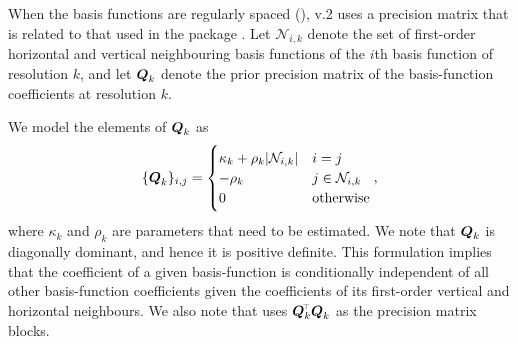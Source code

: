\documentclass[article]{jss}
\def\mbf#1{{%
\mathchoice%
{\hbox{\boldmath$\displaystyle{#1}$}}%
{\hbox{\boldmath$\textstyle{#1}$}}%
{\hbox{\boldmath$\scriptstyle{#1}$}}%
{\hbox{\boldmath$\scriptscriptstyle{#1}$}}%
}}
\def\vec{\mbf}
\newcommand{\tp}{{\!\scriptscriptstyle \top}}
\begin{document}
\begin{appendix}
When the basis functions are regularly spaced (),  v.2 uses a precision matrix that is related to that used in the  package  \citep{Nychka_2016_LatticeKrig}. 
 Let $\mathcal{N}_{i, k}$ denote the set of first-order horizontal and vertical neighbouring basis functions of the $i$th basis function of resolution $k$, 
 and let $\vec{Q}_k$ denote the prior precision matrix of the basis-function coefficients at resolution $k$. 

We model the elements of $\vec{Q}_k$ as
\begin{equation}\label{eqn:Q_k}
    \{\vec{Q}_{k}\}_{i, j}
=
\begin{cases}
\kappa_k + \rho_k |\mathcal{N}_{i, k}|   & i = j\\
-\rho_k & j \in \mathcal{N}_{i, k} \\
0 & \text{otherwise}
\end{cases},
\end{equation}
where $\kappa_k$ and $\rho_k$ are parameters that need to be estimated. 
We note that $\vec{Q}_k$ is diagonally dominant, and hence it is positive definite. 
 This formulation implies that the coefficient of a given basis-function is conditionally independent of all other basis-function coefficients given the coefficients of its first-order vertical and horizontal neighbours. 
 We also note that  uses $\vec{Q}_k^\tp\vec{Q}_k$ as the precision matrix blocks. 



\end{appendix}
\end{document}
